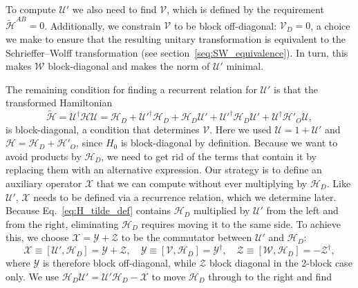 To compute $\mathcal{U}'$ we also need to find $\mathcal{V}$, which is defined by the requirement $\tilde{\mathcal{H}}^{AB} = 0$.
Additionally, we constrain $\mathcal{V}$ to be block off-diagonal: $\mathcal{V}_{D} = 0$, a choice we make to ensure that the resulting unitary transformation is equivalent to the Schrieffer--Wolff transformation (see section~\ref{seq:SW_equivalence}).
In turn, this makes $\mathcal{W}$ block-diagonal and makes the norm of $\mathcal{U}'$ minimal.

The remaining condition for finding a recurrent relation for $\mathcal{U}'$ is that the transformed Hamiltonian
%
\begin{equation}
\label{eq:H_tilde_def}
\tilde{\mathcal{H}} = \mathcal{U}^\dagger \mathcal{H} \mathcal{U} = \mathcal{H}_{D} +
\mathcal{U}'^\dagger \mathcal{H}_{D} + \mathcal{H}_{D} \mathcal{U}' + \mathcal{U}'^\dagger \mathcal{H}_{D}
\mathcal{U}' + \mathcal{U}^\dagger\mathcal{H}'_{O}\mathcal{U},
\end{equation}
%
is block-diagonal, a condition that determines $\mathcal{V}$.
Here we used $\mathcal{U}=1+\mathcal{U}'$ and $\mathcal{H} = \mathcal{H}_{D} + \mathcal{H}'_{O}$, since $H_0$ is block-diagonal by definition.
Because we want to avoid products by $\mathcal{H}_{D}$, we need to get rid of the terms that contain it by replacing them with an alternative expression.
Our strategy is to define an auxiliary operator $\mathcal{X}$ that we can compute without ever multiplying by $\mathcal{H}_{D}$.
Like $\mathcal{U}'$, $\mathcal{X}$ needs to be defined via a recurrence relation, which we determine later.
Because Eq.~\eqref{eq:H_tilde_def} contains $\mathcal{H}_{D}$ multiplied by $\mathcal{U}'$ from the left and from the right, eliminating $\mathcal{H}_{D}$ requires moving it to the same side.
To achieve this, we choose $\mathcal{X}=\mathcal{Y}+\mathcal{Z}$ to be the commutator between $\mathcal{U}'$ and $\mathcal{H}_{D}$:
%
\begin{equation}
\label{eq:XYZ}
\mathcal{X} \equiv [\mathcal{U}', \mathcal{H}_{D}] = \mathcal{Y} + \mathcal{Z}, \quad
\mathcal{Y} \equiv [\mathcal{V}, \mathcal{H}_{D}] = \mathcal{Y}^\dagger,\quad
\mathcal{Z} \equiv [\mathcal{W}, \mathcal{H}_{D}] = -\mathcal{Z}^\dagger,
\end{equation}
%
where $\mathcal{Y}$ is therefore block off-diagonal, while $\mathcal{Z}$ block diagonal in the 2-block case only.
We use $\mathcal{H}_{D} \mathcal{U}' = \mathcal{U}' \mathcal{H}_{D} -\mathcal{X}$ to move $\mathcal{H}_{D}$ through to the right and find
